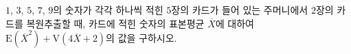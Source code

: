 $1$, $3$, $5$, $7$, $9$의 숫자가 각각 하나씩 적힌 $5$장의 카드가 들어 있는 주머니에서 $2$장의 카드를 복원추출할 때, 카드에 적힌 숫자의 표본평균 $\overline{X}$에 대하여 $\mathrm{E}(\overline{X}^2)+\mathrm{V}(4\overline{X}+2)$의 값을 구하시오.

